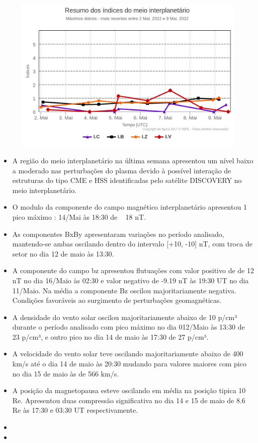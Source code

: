 \documentclass[a4paper, 10pt]{article}
\begin{document}
 \begin{figure}[H]
    \centering
    \includegraphics[width=14cm]{./figures//figureMIIndex.png}
\end{figure}
 \begin{itemize}
 \item A região do meio interplanetário na última  semana apresentou um nível  baixo a moderado nas perturbações  do plasma devido à possível interação de estruturas do tipo CME e HSS identificadas pelo satélite DISCOVERY no meio interplanetário.
\item O modulo da componente do campo magnético interplanetário apresentou 1 pico máximo : 14/Mai às 18:30  de ~ 18 nT. 
\item As componentes BxBy apresentaram variações no período analisado, mantendo-se ambas oscilando dentro do intervalo [+10, -10] nT, com troca de setor no dia 12 de maio às 13:30.  
\item A componente do campo bz apresentou flutuações com valor positivo de de 12 nT no dia 16/Maio às 02:30 e valor negativo de -9.19 nT às 19:30 UT no dia 11/Maio.  Na média  a componente Bz  oscilou majoritariamente negativa. Condições favoráveis ao surgimento de perturbações geomagnéticas.
\item A densidade do vento solar oscilou majoritariamente abaixo de 10 p/cm³ durante o período analisado com pico máximo no dia 012/Maio às 13:30 de 23 p/cm³, e outro pico no dia 14 de maio às 17:30 de 27 p/cm³. 
\item A velocidade do vento solar teve oscilando majoritariamente abaixo de 400 km/s até o dia 14 de maio às 20:30 mudando para valores maiores com pico no dia 15 de maio às de 566 km/s.
\item A posição da magnetopausa esteve oscilando em média  na posição tipica 10 Re. Apresentou duas compressão significativa no dia 14 e 15 de maio de 8.6 Re às 17:30 e 03:30 UT respectivamente.
\item   
\item  
\end{itemize} 
\end{document}
